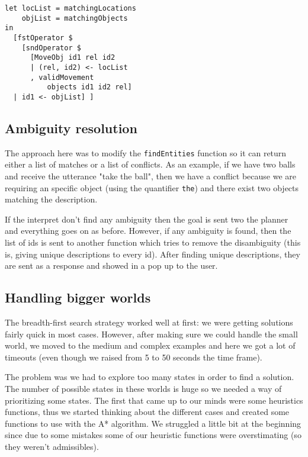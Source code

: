 \documentclass[11pt]{article}
\begin{document}
\begin{verbatim}
let locList = matchingLocations
    objList = matchingObjects
in
  [fstOperator $
    [sndOperator $ 
      [MoveObj id1 rel id2
      | (rel, id2) <- locList
      , validMovement 
          objects id1 id2 rel]
  | id1 <- objList] ]
\end{verbatim}
	
        \subsection{Ambiguity resolution}
          The approach here was to modify the \texttt{findEntities} function so it can return
           either a list of matches or a list of conflicts. As an example, if we have two 
           balls and receive the utterance "take the ball", then we have a conflict because 
           we are requiring an specific object (using the quantifier \texttt{the}) and there            exist two objects matching the description.

          If the interpret don't find any ambiguity then the goal is sent two the planner 
          and everything goes on as before. However, if any ambiguity is found, then the 
          list of ids is sent to another function which tries to remove the disambiguity 
          (this is, giving unique descriptions to every id). After finding unique 
          descriptions, they are sent as a response and showed in a pop up to the user.

        \subsection{Handling bigger worlds}
        The breadth-first search strategy worked well at first: we were getting solutions 
        fairly quick in most cases. However, after making sure we could handle the small 
        world, we moved to the medium and complex examples and here we got a lot of 
        timeouts (even though we raised from 5 to 50 seconds the time frame).

        The problem was we had to explore too many states in order to find a solution. The 
        number of possible states in these worlds is huge so we needed a way of
        prioritizing some states. The first that came up to our minds were some
        heuristics functions, thus we started thinking about the different cases
        and created some functions to use with the A* algorithm. We struggled a little
        bit at the beginning since due to some mistakes some of our heuristic functions
        were overstimating (so they weren't admissibles).
        
\end{document}
